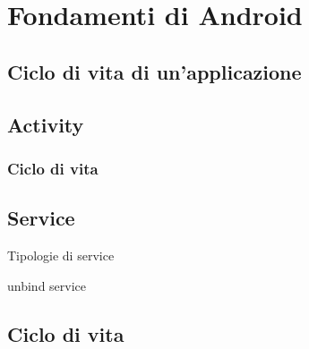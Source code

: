 \documentclass[../ManualeSviluppatore.tex]{subfiles}
\begin{document}
\begin{appendices}
	\label{sec:FondamentiDiAndroid}
	\section{Fondamenti di Android}
	
		\subsection{Ciclo di vita di un'applicazione}
		
		\subsection{Activity}
		
			\subsubsection{Ciclo di vita}
			
		\subsection{Service}
		
			Tipologie di service
			\begin{description}
				\item unbind service
			\end{description}
		
			\subsection{Ciclo di vita}
			
			

\end{appendices}
\end{document}
